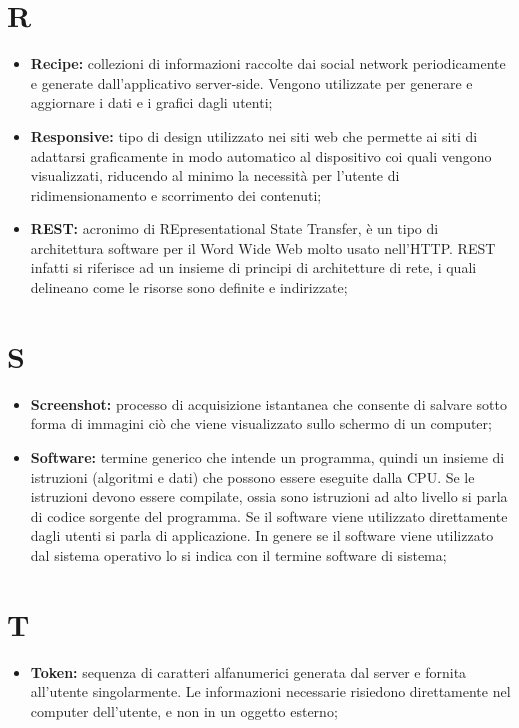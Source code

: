 	\section*{\Huge R} %
		\begin{itemize}
			\item \textbf{Recipe:} collezioni di informazioni raccolte dai social network periodicamente e generate dall'applicativo server-side. Vengono utilizzate per generare e aggiornare i dati e i grafici dagli utenti;
			\item \textbf{Responsive:} tipo di design utilizzato nei siti web che permette ai siti di adattarsi graficamente in modo automatico al dispositivo coi quali vengono visualizzati, riducendo al minimo la necessità per l'utente di ridimensionamento e scorrimento dei contenuti;
			\item \textbf{REST:} acronimo di REpresentational State Transfer, è un tipo di architettura software per il Word Wide Web molto usato nell'HTTP. REST infatti si riferisce ad un insieme di principi di architetture di rete, i quali delineano come le risorse sono definite e indirizzate;
			\end{itemize}


	\section*{\Huge S} %
		\begin{itemize}
			\item \textbf{Screenshot:} processo di acquisizione istantanea che consente di salvare sotto forma di immagini ciò che viene visualizzato sullo schermo di un computer;
			\item \textbf{Software:} termine generico che intende un programma, quindi un insieme di istruzioni (algoritmi e dati) che possono essere eseguite dalla CPU. Se le istruzioni devono essere compilate, ossia sono istruzioni ad alto livello si parla di codice sorgente del programma. Se il software viene utilizzato direttamente dagli utenti si parla di applicazione. In genere se il software viene utilizzato dal sistema operativo lo si indica con il termine software di sistema;
		\end{itemize}


	\section*{\Huge T} %
		\begin{itemize}
			\item \textbf{Token:} sequenza di caratteri alfanumerici generata dal server e fornita all'utente singolarmente. Le informazioni necessarie risiedono direttamente nel computer dell'utente, e non in un oggetto esterno;
		\end{itemize}


